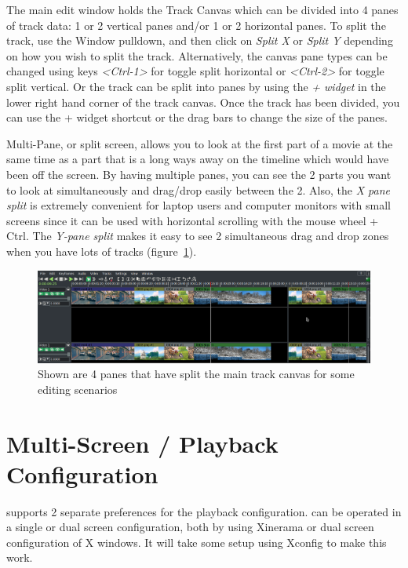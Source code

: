The main \CGG{} edit window holds the Track Canvas which can be divided into 4 panes of track data: 1 or 2 vertical panes and/or 1 or 2 horizontal panes.  To split the track, use the Window pulldown, and then click on \textit{Split X} or \textit{Split Y} depending on how you wish to split the track.  Alternatively, the canvas pane types can be changed using keys \textit{<Ctrl-1>} for toggle split horizontal or \textit{<Ctrl-2>} for toggle split vertical.  Or the track can be split into panes by using the \textit{+ widget} in the lower right hand corner of the track canvas.  Once the track has been divided, you can use the + widget shortcut or the drag bars to change the size of the panes.

Multi-Pane, or split screen, allows you to look at the first part of a movie at the same time as a part that is a long ways away on the timeline which would have been off the screen.  By having multiple panes, you can see the 2 parts you want to look at simultaneously and drag/drop easily between the 2.  Also, the \textit{X pane split} is extremely convenient for laptop users and computer monitors with small screens since it can be used with horizontal scrolling with the mouse wheel + Ctrl.  The \textit{Y-pane split} makes it easy to see 2 simultaneous drag and drop zones when you have lots of tracks (figure~\ref{fig:multi-pane01}).

\begin{figure}[htpb]
    \centering
    \includegraphics[width=1.0\linewidth]{images/multi-pane01.png}
    \caption{Shown are 4 panes that have split the main track canvas for some editing scenarios}
    \label{fig:multi-pane01}
\end{figure}

\section{Multi-Screen / Playback Configuration}%
\label{sec:multiscreen_playback_configuration}

\CGG{} supports 2 separate preferences for the playback configuration.  \CGG{} can be operated in a single or dual screen configuration, both by using Xinerama or dual screen configuration of X windows.  It will take some setup using Xconfig to make this work.

